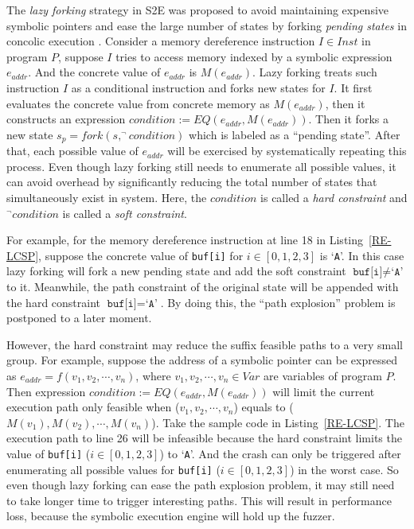 The \textit{lazy forking} strategy in S2E was proposed to avoid 
maintaining expensive symbolic pointers and ease the large number 
of states by forking \textit{pending states} in concolic 
execution \cite{chipounov2011s2e}. 
Consider a memory dereference instruction $I\in Inst$ in program $P$, 
suppose $I$ tries to access memory indexed by a symbolic expression 
$e_{addr}$. And the concrete value of $e_{addr}$ is $M(e_{addr})$.
Lazy forking treats such instruction $I$ as a conditional instruction 
and forks new states for $I$. It first evaluates the concrete value 
from concrete memory as $M(e_{addr})$, then it constructs an 
expression $condition:= EQ(e_{addr}, M(e_{addr}))$. Then it forks a 
new state $s_p=fork(s, ^\neg condition)$ which is labeled as a 
``pending state''. After that, each possible value of $e_{addr}$ 
will be exercised by systematically repeating this process. Even 
though lazy forking still needs to enumerate all possible values, 
it can avoid overhead by significantly reducing the total number 
of states that simultaneously exist in system. Here, 
the $condition$ is called a \textit{hard constraint} and 
$^\neg condition$ is called a \textit{soft constraint}.

For example, for the memory dereference instruction at line 18 
in Listing~\ref{RE-LCSP}, suppose the concrete value of 
\texttt{buf[i]} for $i\in[0,1,2,3]$ is `\texttt{A}'. 
In this case lazy forking will fork a new pending state and 
add the soft constraint $\texttt{buf[i]}\neq\texttt{`A'}$ to 
it. Meanwhile, the path constraint of the original state will 
be appended with the hard constraint $\texttt{buf[i]}=\texttt{`A'}$.
By doing this, the ``path explosion'' problem is postponed to a later moment.

However, the hard constraint may reduce the suffix feasible paths 
to a very small group. For example, suppose the address of a symbolic 
pointer can be expressed as $e_{addr}=f(v_1, v_2,\cdots, v_n)$, 
where $v_1, v_2,\cdots, v_n\in Var$ are variables of program $P$. 
Then expression $condition:= EQ(e_{addr}, M(e_{addr}))$ will limit 
the current execution path only feasible when ($v_1, v_2,\cdots, v_n$) 
equals to ($M(v_1), M(v_2),\cdots, M(v_n)$). 
Take the sample code in Listing~\ref{RE-LCSP}. The execution path 
to line 26 will be infeasible because the hard constraint limits 
the value of \texttt{buf[i]} ($i\in[0,1,2,3]$) to `\texttt{A}'. 
And the crash can only be triggered after enumerating all possible 
values for \texttt{buf[i]} ($i\in[0,1,2,3]$) in the worst case.
So even though lazy forking can ease the path explosion problem, 
it may still need to take longer time to trigger interesting paths. 
This will result in performance loss, because the symbolic 
execution engine will hold up the fuzzer. 

